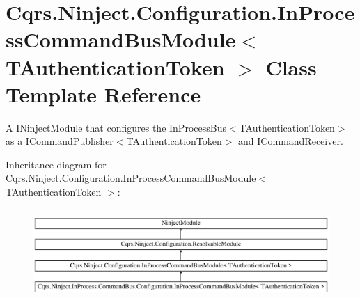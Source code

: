 \hypertarget{classCqrs_1_1Ninject_1_1Configuration_1_1InProcessCommandBusModule}{}\section{Cqrs.\+Ninject.\+Configuration.\+In\+Process\+Command\+Bus\+Module$<$ T\+Authentication\+Token $>$ Class Template Reference}
\label{classCqrs_1_1Ninject_1_1Configuration_1_1InProcessCommandBusModule}


A I\+Ninject\+Module that configures the In\+Process\+Bus$<$\+T\+Authentication\+Token$>$ as a I\+Command\+Publisher$<$\+T\+Authentication\+Token$>$ and I\+Command\+Receiver.  


Inheritance diagram for Cqrs.\+Ninject.\+Configuration.\+In\+Process\+Command\+Bus\+Module$<$ T\+Authentication\+Token $>$\+:\begin{figure}[H]
\begin{center}
\leavevmode
\includegraphics[height=3.544304cm]{classCqrs_1_1Ninject_1_1Configuration_1_1InProcessCommandBusModule}
\end{center}
\end{figure}
